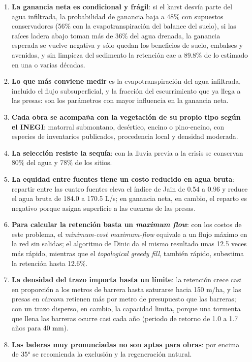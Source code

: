 \documentclass[11pt,letterpaper]{article}
\begin{document}
\begin{enumerate}
  \item \textbf{La ganancia neta es condicional y frágil}: si el karst desvía parte del agua infiltrada, la probabilidad de ganancia baja a 48\% con supuestos conservadores (56\% con la evapotranspiración del balance del suelo), si las raíces ladera abajo toman más de 36\% del agua drenada, la ganancia esperada se vuelve negativa y sólo quedan los beneficios de suelo, embalses y avenidas, y sin limpieza del sedimento la retención cae a 89.8\% de lo estimado en una o varias décadas.
  \item \textbf{Lo que más conviene medir} es la evapotranspiración del agua infiltrada, incluido el flujo subsuperficial, y la fracción del escurrimiento que ya llega a las presas: son los parámetros con mayor influencia en la ganancia neta.
  \item \textbf{Cada obra se acompaña con la vegetación de su propio tipo según el INEGI}: matorral submontano, desértico, encino o pino-encino, con especies de inventarios publicados, procedencia local y densidad moderada.
  \item \textbf{La selección resiste la sequía}: con la lluvia previa a la crisis se conservan 80\% del agua y 78\% de los sitios.
  \item \textbf{La equidad entre fuentes tiene un costo reducido en agua bruta}: repartir entre las cuatro fuentes eleva el índice de Jain de 0.54 a 0.96 y reduce el agua bruta de 184.0 a 170.5 L/s; en ganancia neta, en cambio, el reparto es negativo porque asigna superficie a las cuencas de las presas.
  \item \textbf{Para calcular la retención basta un \emph{maximum flow}}: con los costos de este problema, el \emph{minimum-cost maximum-flow} equivale a un flujo máximo en la red sin salidas; el algoritmo de Dinic da el mismo resultado unas 12.5 veces más rápido, mientras que el \emph{topological greedy fill}, también rápido, subestima la retención hasta 12.6\%.
  \item \textbf{La densidad del trazo importa hasta un límite}: la retención crece casi en proporción a los metros de barrera hasta saturarse hacia 150 m/ha, y las presas en cárcava retienen más por metro de presupuesto que las barreras; con un trazo disperso, en cambio, la capacidad limita, porque una tormenta que llena las barreras ocurre casi cada año (periodo de retorno de 1.0 a 1.7 años para 40 mm).
  \item \textbf{Las laderas muy pronunciadas no son aptas para obras}: por encima de 35° se recomienda la exclusión y la regeneración natural.
\end{enumerate}
\end{document}
